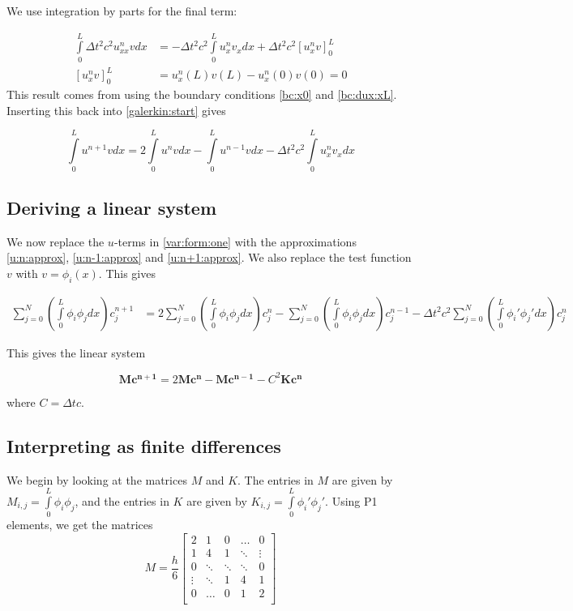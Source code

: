 \documentclass[twoside]{article}
\begin{document}
We use integration by parts for the final term:

\begin{align*}
\int\limits^L_0 \Delta t^2c^2 u^n_{xx} v dx &= -\Delta t^2c^2 \int\limits^L_0 u^n_x v_x dx + 
\Delta t^2c^2 \left[u_x^n v\right]^L_0 \\
\left[u_x^n v\right]^L_0 &= u_x^n(L) v(L) - u_x^n(0) v(0) = 0
\end{align*}
This result comes from using the boundary conditions \eqref{bc:x0} and \eqref{bc:dux:xL}. Inserting this back into \eqref{galerkin:start} gives

\begin{equation}
\int\limits^L_0 u^{n+1} v dx = 2\int\limits^L_0 u^{n} v dx - \int\limits^L_0 u^{n-1} v dx - 
\Delta t^2c^2 \int\limits^L_0 u^n_x v_x dx
\label{var:form:one}
\end{equation} 


\subsection{Deriving a linear system}


We now replace the $u$-terms in \eqref{var:form:one} with the approximations \eqref{u:n:approx}, \eqref{u:n-1:approx} and \eqref{u:n+1:approx}. We also replace the test function $v$ with $v = \phi_i(x)$. This gives

\begin{align}
\sum^N_{j=0}\left(\int\limits_0^L \phi_i \phi_j dx\right) c_j^{n+1} &=
2 \sum^N_{j=0}\left(\int\limits_0^L \phi_i \phi_j dx\right) c_j^{n} - 
\sum^N_{j=0}\left(\int\limits_0^L \phi_i \phi_j dx\right) c_j^{n-1} - 
\Delta t^2c^2 \sum^N_{j=0}\left(\int\limits_0^L \phi_i' \phi_j' dx\right) c_j^{n}
\end{align}

This gives the linear system

\begin{equation}
\mathbf{Mc^{n+1}} = 2\mathbf{Mc^{n}} - \mathbf{Mc^{n-1}} - C^2\mathbf{Kc^{n}}
\end{equation}

where $C = \Delta t c$.


\subsection{Interpreting as finite differences}

We begin by looking at the matrices $M$ and $K$. The entries in $M$ are given by $M_{i,j} = \int\limits_0^L\phi_i\phi_j$, and the entries in $K$ are given by $K_{i,j} = \int\limits_0^L\phi_i'\phi_j'$. Using P1 elements, we get the matrices
\begin{equation}
M = \frac{h}{6}\left[
\begin{matrix}
2 & 1 & 0 & \hdots & 0\\
1 & 4 & 1 & \ddots & \vdots\\
0 & \ddots & \ddots & \ddots & 0\\
\vdots & \ddots & 1 & 4 & 1\\
0 & \hdots & 0 & 1 & 2\\
\end{matrix}\right] 
\end{equation}
\end{document}
